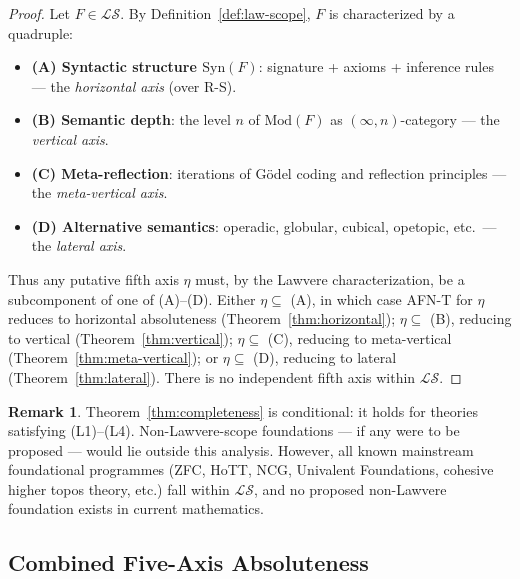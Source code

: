 \documentclass[11pt]{article}
\theoremstyle{plain}
\theoremstyle{definition}
\newtheorem{remark}[theorem]{Remark}
\newcommand{\cS}{\mathcal{S}}
\newcommand{\cL}{\mathcal{L}}
\newcommand{\Syn}{\mathrm{Syn}}
\newcommand{\Mod}{\mathrm{Mod}}
\begin{document}
\begin{proof}
Let $F \in \cL\cS$. By Definition~\ref{def:law-scope}, $F$ is characterized by a quadruple:
\begin{itemize}
\item \textbf{(A) Syntactic structure $\Syn(F)$}: signature + axioms + inference rules --- the \emph{horizontal axis} (over R-S).
\item \textbf{(B) Semantic depth}: the level $n$ of $\Mod(F)$ as $(\infty, n)$-category --- the \emph{vertical axis}.
\item \textbf{(C) Meta-reflection}: iterations of G\"odel coding and reflection principles --- the \emph{meta-vertical axis}.
\item \textbf{(D) Alternative semantics}: operadic, globular, cubical, opetopic, etc.\ --- the \emph{lateral axis}.
\end{itemize}
Thus any putative fifth axis $\eta$ must, by the Lawvere characterization, be a subcomponent of one of (A)--(D). Either $\eta \subseteq$ (A), in which case AFN-T for $\eta$ reduces to horizontal absoluteness (Theorem~\ref{thm:horizontal}); $\eta \subseteq$ (B), reducing to vertical (Theorem~\ref{thm:vertical}); $\eta \subseteq$ (C), reducing to meta-vertical (Theorem~\ref{thm:meta-vertical}); or $\eta \subseteq$ (D), reducing to lateral (Theorem~\ref{thm:lateral}). There is no independent fifth axis within $\cL\cS$.
\end{proof}

\begin{remark}
Theorem~\ref{thm:completeness} is conditional: it holds for theories satisfying (L1)--(L4). Non-Lawvere-scope foundations --- if any were to be proposed --- would lie outside this analysis. However, all known mainstream foundational programmes (ZFC, HoTT, NCG, Univalent Foundations, cohesive higher topos theory, etc.) fall within $\cL\cS$, and no proposed non-Lawvere foundation exists in current mathematics.
\end{remark}

\subsection{Combined Five-Axis Absoluteness}
\end{document}
